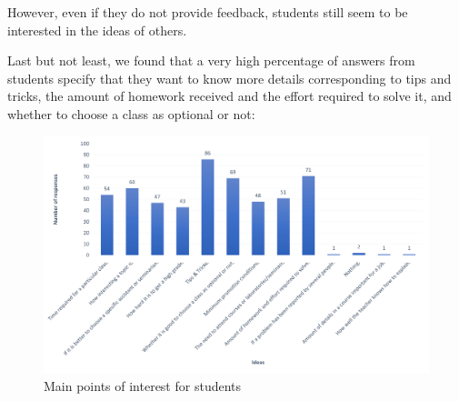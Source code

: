     However, even if they do not provide feedback, students still seem to be interested in the ideas of others.
    
	Last but not least, we found that a very high percentage of answers from students specify that they want to know more details corresponding to tips and tricks, the amount of homework received and the effort required to solve it, and whether to choose a class as optional or not:
	
	\begin{figure}[ht]
        \centering
             \includegraphics[height=0.42\textheight]{figures/charts/survey/students_interest.png}
        \caption{Main points of interest for students}
        \label{3:fig:students_interest}
    \end{figure}


    

